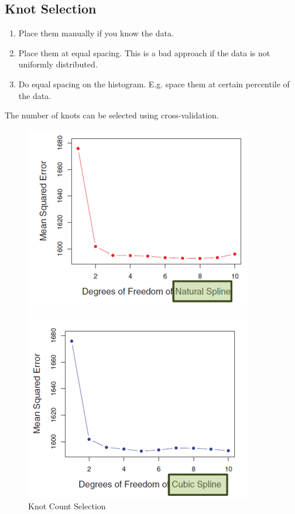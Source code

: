 \documentclass[../Main.tex]{subfiles}
\begin{document}
\subsection{Knot Selection}
\begin{multicols}{2}
    \begin{enumerate}
        \item Place them manually if you know the data.
        \item Place them at equal spacing. This is a bad approach if
        the data is not uniformly distributed.
        \item Do equal spacing on the histogram. E.g. space them
        at certain percentile of the data.
    \end{enumerate}
    The number of knots can be selected using cross-validation.
    
    \begin{figure}[H]
        \centering
        \includegraphics[width=0.75\linewidth]{Images/number-of-knots.png}
        \caption{Knot Count Selection}
    \end{figure}
\end{multicols}
\end{document}
